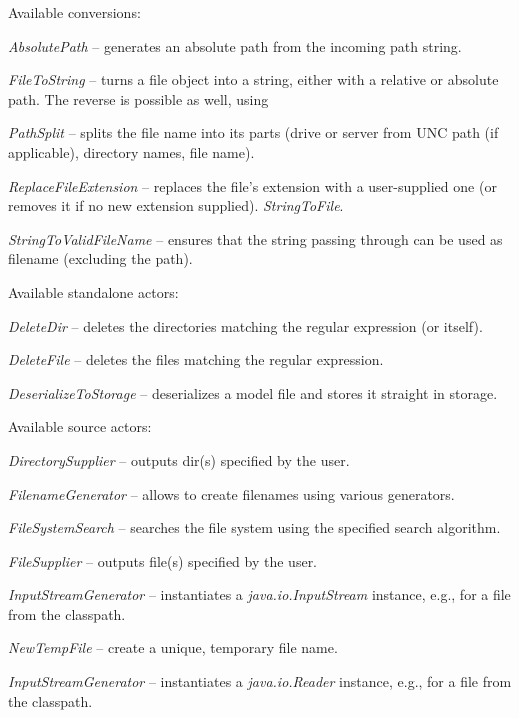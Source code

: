 Available conversions:
\begin{tight_itemize}
	\item \textit{AbsolutePath} -- generates an absolute path from the incoming path string.
	\item \textit{FileToString} -- turns a file object into a string, either with a
	relative or absolute path. The reverse is possible as well, using
	\item \textit{PathSplit} -- splits the file name into its parts (drive or
	server from UNC path (if applicable), directory names, file name).
	\item \textit{ReplaceFileExtension} -- replaces the file's extension with
	a user-supplied one (or removes it if no new extension supplied).
	\textit{StringToFile}.
	\item \textit{StringToValidFileName} -- ensures that the string passing through can
	be used as filename (excluding the path).
\end{tight_itemize}
Available standalone actors:
\begin{tight_itemize}
  \item \textit{DeleteDir} -- deletes the directories matching the regular expression (or itself).
  \item \textit{DeleteFile} -- deletes the files matching the regular expression.
	\item \textit{DeserializeToStorage} -- deserializes a model file and
	stores it straight in storage.
\end{tight_itemize}
Available source actors:
\begin{tight_itemize}
	\item \textit{DirectorySupplier} -- outputs dir(s) specified by the user.
	\item \textit{FilenameGenerator} -- allows to create filenames using various
	generators.
	\item \textit{FileSystemSearch} -- searches the file system using the
	specified search algorithm.
	\item \textit{FileSupplier} -- outputs file(s) specified by the user.
	\item \textit{InputStreamGenerator} -- instantiates a \textit{java.io.InputStream} instance,
	e.g., for a file from the classpath.
	\item \textit{NewTempFile} -- create a unique, temporary file name.
	\item \textit{InputStreamGenerator} -- instantiates a \textit{java.io.Reader} instance,
	e.g., for a file from the classpath.
\end{tight_itemize}
